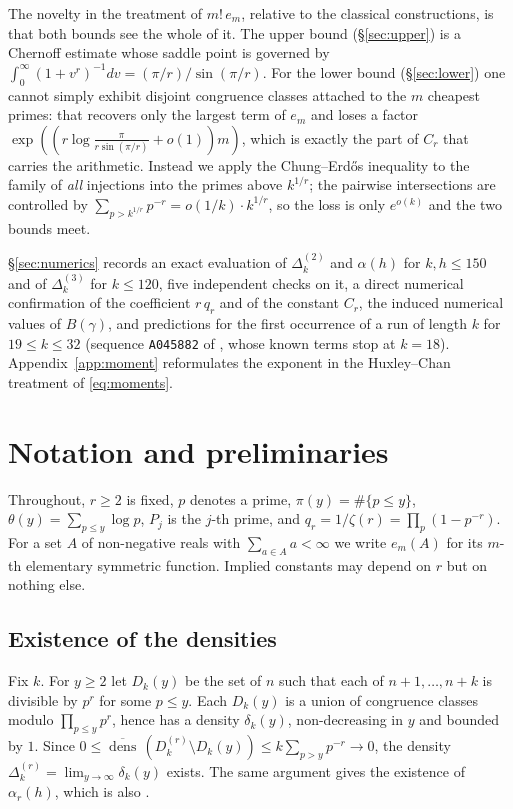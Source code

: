 \documentclass[10pt,a4paper]{amsart}
\numberwithin{equation}{section}
\DeclareMathOperator{\dens}{dens}
\begin{document}
The novelty in the treatment of $m!\,e_m$, relative to the classical constructions, is that
both bounds see the whole of it. The upper bound (\S\ref{sec:upper}) is a Chernoff estimate
whose saddle point is governed by $\int_0^{\infty}(1+v^{r})^{-1}dv=(\pi/r)/\sin(\pi/r)$.
For the lower bound (\S\ref{sec:lower}) one cannot simply exhibit disjoint congruence
classes attached to the $m$ cheapest primes: that recovers only the largest term of $e_m$
and loses a factor $\exp((r\log\frac{\pi}{r\sin(\pi/r)}+o(1))m)$, which is exactly the part
of $C_r$ that carries the arithmetic. Instead we apply the Chung--Erd\H{o}s inequality to
the family of \emph{all} injections into the primes above $k^{1/r}$; the pairwise
intersections are controlled by $\sum_{p>k^{1/r}}p^{-r}=o(1/k)\cdot k^{1/r}$, so the loss
is only $e^{o(k)}$ and the two bounds meet.

\S\ref{sec:numerics} records an exact evaluation of $\Delta^{(2)}_k$ and $\alpha(h)$ for
$k,h\le150$ and of $\Delta^{(3)}_k$ for $k\le120$, five independent checks on it,
a direct numerical confirmation of the coefficient $r\,q_r$ and of the constant $C_r$, the
induced numerical values of $B(\gamma)$, and predictions for the first occurrence of a run
of length $k$ for $19\le k\le32$ (sequence \texttt{A045882} of \cite{OEIS}, whose known
terms stop at $k=18$). Appendix~\ref{app:moment} reformulates the exponent in the
Huxley--Chan treatment of \eqref{eq:moments}.

\section{Notation and preliminaries}\label{sec:prelim}

Throughout, $r\ge2$ is fixed, $p$ denotes a prime, $\pi(y)=\#\{p\le y\}$,
$\theta(y)=\sum_{p\le y}\log p$, $P_j$ is the $j$-th prime, and $q_r=1/\zeta(r)=
\prod_p(1-p^{-r})$. For a set $A$ of non-negative reals with $\sum_{a\in A}a<\infty$ we
write $e_m(A)$ for its $m$-th elementary symmetric function. Implied constants may depend
on $r$ but on nothing else.

\subsection*{Existence of the densities}
Fix $k$. For $y\ge2$ let $D_k(y)$ be the set of $n$ such that each of $n+1,\dots,n+k$ is
divisible by $p^{r}$ for some $p\le y$. Each $D_k(y)$ is a union of congruence classes
modulo $\prod_{p\le y}p^{r}$, hence has a density $\delta_k(y)$, non-decreasing in $y$ and
bounded by $1$. Since
$0\le\overline{\dens}\,(D^{(r)}_k\setminus D_k(y))\le k\sum_{p>y}p^{-r}\to0$, the density
$\Delta^{(r)}_k=\lim_{y\to\infty}\delta_k(y)$ exists. The same argument gives the existence
of $\alpha_r(h)$, which is also \cite[Thm.~4]{Mirsky}.
\end{document}
